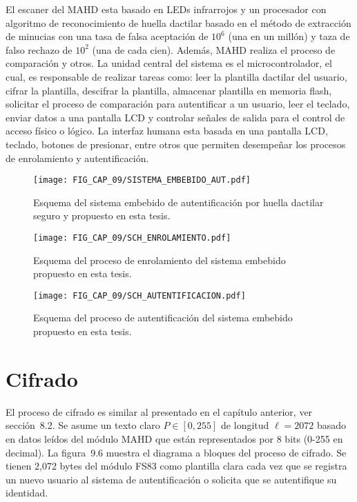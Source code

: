El escaner del MAHD esta basado en LEDs infrarrojos y un procesador con algoritmo de reconocimiento de huella dactilar basado en el método de extracción de minucias con una tasa de falsa aceptación de $10^{6}$ (una en un millón) y taza de falso rechazo de $10^{2}$ (una de cada cien). Además, MAHD realiza el proceso de comparación y otros. La unidad central del sistema es el microcontrolador, el cual, es responsable de realizar tareas como: leer  la plantilla dactilar del usuario, cifrar la plantilla, descifrar la plantilla, almacenar plantilla en memoria flash, solicitar el proceso de comparación para autentificar a un usuario, leer el teclado, enviar datos a una pantalla LCD y controlar señales de salida para el control de acceso físico o lógico. La interfaz humana esta basada en una pantalla LCD, teclado, botones de presionar, entre otros que permiten desempeñar los procesos de enrolamiento y autentificación. 

\begin{figure}[!htbp] %
	\center
	\texttt{[image: FIG\_CAP\_09/SISTEMA\_EMBEBIDO\_AUT.pdf]} 
	\caption{Esquema del sistema embebido de autentificación por huella dactilar seguro y propuesto en esta tesis.}
\end{figure}
\begin{figure}[!htbp] %
	\center
	\texttt{[image: FIG\_CAP\_09/SCH\_ENROLAMIENTO.pdf]} 
	\caption{Esquema del proceso de enrolamiento del sistema embebido propuesto en esta tesis.}
\end{figure}
\begin{figure}[!htbp] %
	\center
	\texttt{[image: FIG\_CAP\_09/SCH\_AUTENTIFICACION.pdf]}  
	\caption{Esquema del proceso de autentificación del sistema embebido propuesto en esta tesis.}
\end{figure}

\section{Cifrado}
El proceso de cifrado es similar al presentado en el capítulo anterior, ver sección~8.2. Se asume un texto claro $P\in [0,255]$ de longitud $\ell=2072$ basado en datos leídos del módulo MAHD que están representados por 8 bits (0-255 en decimal). La figura~9.6 muestra el diagrama a bloques del proceso de cifrado. Se tienen 2,072 bytes del módulo FS83 como plantilla clara cada vez que se registra un nuevo usuario al sistema de autentificación o solicita que se autentifique su identidad.    \\


